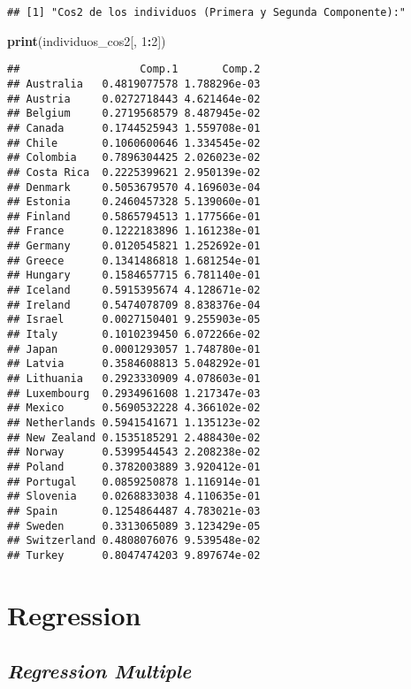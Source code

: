 \documentclass[
]{article}
\newenvironment{Shaded}{\begin{snugshade}}{\end{snugshade}}
\newcommand{\DecValTok}[1]{\textcolor[rgb]{0.00,0.00,0.81}{#1}}
\newcommand{\FunctionTok}[1]{\textcolor[rgb]{0.13,0.29,0.53}{\textbf{#1}}}
\newcommand{\NormalTok}[1]{#1}
\newcommand{\SpecialCharTok}[1]{\textcolor[rgb]{0.81,0.36,0.00}{\textbf{#1}}}
\begin{document}
\begin{verbatim}
## [1] "Cos2 de los individuos (Primera y Segunda Componente):"
\end{verbatim}

\begin{Shaded}
\begin{Highlighting}[]
\FunctionTok{print}\NormalTok{(individuos\_cos2[, }\DecValTok{1}\SpecialCharTok{:}\DecValTok{2}\NormalTok{])}
\end{Highlighting}
\end{Shaded}

\begin{verbatim}
##                   Comp.1       Comp.2
## Australia   0.4819077578 1.788296e-03
## Austria     0.0272718443 4.621464e-02
## Belgium     0.2719568579 8.487945e-02
## Canada      0.1744525943 1.559708e-01
## Chile       0.1060600646 1.334545e-02
## Colombia    0.7896304425 2.026023e-02
## Costa Rica  0.2225399621 2.950139e-02
## Denmark     0.5053679570 4.169603e-04
## Estonia     0.2460457328 5.139060e-01
## Finland     0.5865794513 1.177566e-01
## France      0.1222183896 1.161238e-01
## Germany     0.0120545821 1.252692e-01
## Greece      0.1341486818 1.681254e-01
## Hungary     0.1584657715 6.781140e-01
## Iceland     0.5915395674 4.128671e-02
## Ireland     0.5474078709 8.838376e-04
## Israel      0.0027150401 9.255903e-05
## Italy       0.1010239450 6.072266e-02
## Japan       0.0001293057 1.748780e-01
## Latvia      0.3584608813 5.048292e-01
## Lithuania   0.2923330909 4.078603e-01
## Luxembourg  0.2934961608 1.217347e-03
## Mexico      0.5690532228 4.366102e-02
## Netherlands 0.5941541671 1.135123e-02
## New Zealand 0.1535185291 2.488430e-02
## Norway      0.5399544543 2.208238e-02
## Poland      0.3782003889 3.920412e-01
## Portugal    0.0859250878 1.116914e-01
## Slovenia    0.0268833038 4.110635e-01
## Spain       0.1254864487 4.783021e-03
## Sweden      0.3313065089 3.123429e-05
## Switzerland 0.4808076076 9.539548e-02
## Turkey      0.8047474203 9.897674e-02
\end{verbatim}

\section{\texorpdfstring{\textbf{Regression}}{Regression}}\label{regression}

\subsection{\texorpdfstring{\emph{Regression
Multiple}}{Regression Multiple}}\label{regression-multiple}
\end{document}
